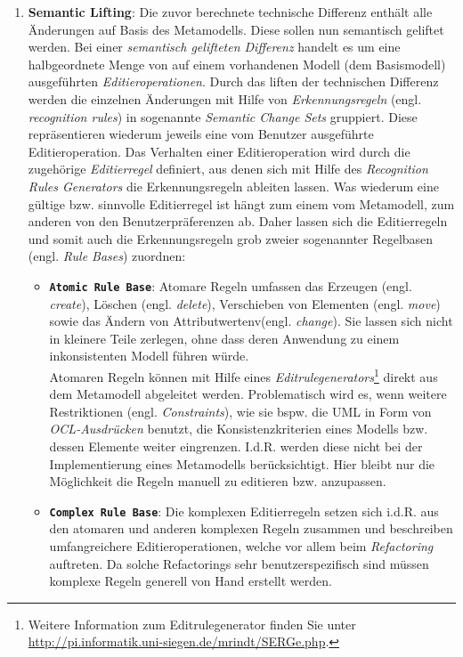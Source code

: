 \begin{enumerate}
\item \textbf{Semantic Lifting}:\label{page:semantic_change_sets}
Die zuvor berechnete technische Differenz enthält alle Än\-der\-ung\-en  auf Basis des Metamodells.
Diese sollen nun semantisch geliftet werden.
Bei einer \textit{semantisch gelifteten Differenz} handelt es um eine halbgeordnete Menge von auf einem vorhandenen Modell (dem Basismodell) ausgeführten \textit{Editieroperationen}.
Durch das liften der technischen Differenz werden die einzelnen Änderungen mit Hilfe von \textit{Erkennungsregeln} (engl. \textit{recognition rules}) in sogenannte \textit{Semantic Change Sets} gruppiert. Diese repräsentieren wiederum jeweils eine vom Benutzer ausgeführte Editieroperation.
Das Verhalten einer Editieroperation wird durch die zugehörige \textit{Editierregel} definiert, aus denen sich mit Hilfe des \textit{Recognition Rules Generators} die Erkennungsregeln ableiten lassen. 
Was wiederum eine gültige bzw. sinnvolle Editierregel ist hängt zum einem vom Metamodell, zum anderen von den Benutzerpräferenzen ab. 
Daher lassen sich die Editierregeln und somit auch die Erkennungsregeln grob zweier sogenannter Regelbasen (engl. \textit{Rule Bases}) zuordnen:

\begin{itemize}
\item \textbf{\texttt{Atomic Rule Base}}: 
Atomare Regeln umfassen das Erzeugen (engl. \textit{create}), Löschen (engl. \textit{delete}), Verschieben von Elementen (engl. \textit{move}) sowie das Ändern von Attributwertenv(engl. \textit{change}).
Sie lassen sich nicht in kleinere Teile zerlegen, ohne dass deren Anwendung zu einem inkonsistenten Modell führen würde.\\
Atomaren Regeln können mit Hilfe eines \textit{Editrulegenerators}\footnote{Weitere Information zum Editrulegenerator finden Sie unter \url{http://pi.informatik.uni-siegen.de/mrindt/SERGe.php}.} direkt aus dem Metamodell abgeleitet werden. 
Problematisch wird es, wenn weitere Restriktionen (engl. \textit{Constraints}), wie sie bspw. die UML in Form von \textit{OCL-Ausdrücken} benutzt, die Konsistenzkriterien eines Modells bzw. dessen Elemente weiter eingrenzen. 
I.d.R. werden diese nicht bei der Implementierung eines Metamodells berücksichtigt.
Hier bleibt nur die Möglichkeit die Regeln manuell zu editieren bzw. anzupassen.

\item \textbf{\texttt{Complex Rule Base}}: 
Die komplexen Editierregeln setzen sich i.d.R. aus den atomaren und anderen komplexen Regeln zusammen und beschreiben umfangreichere Editieroperationen, welche vor allem beim \textit{Refactoring} auftreten. 
Da solche Refactorings sehr benutzerspezifisch sind müssen komplexe Regeln generell von Hand erstellt werden.
\end{itemize}


\end{enumerate}
